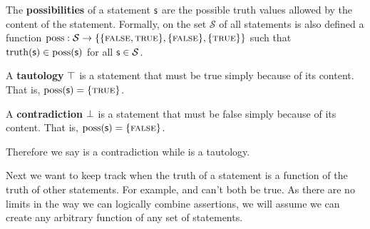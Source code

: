 \documentclass[11pt,letterpaper,fleqn]{memoir} %
\begin{document}
\begin{mathSection}
	
	\begin{axiom}\label{def_possibilities}
		The \textbf{possibilities} of a statement $\mathsf{s}$ are the possible truth values allowed by the content of the statement. Formally, on the set $\mathcal{S}$ of all statements is also defined a function $\operatorname{poss}: \mathcal{S} \to \{\{\textsc{false}, \textsc{true}\},\{\textsc{false}\},\{\textsc{true}\}\}$ such that $\operatorname{truth}(\mathsf{s}) \in \operatorname{poss}(\mathsf{s})$ for all $\mathsf{s} \in \mathcal{S}$.
	\end{axiom}
	
	\begin{defn}
		A \textbf{tautology} $\top$ is a statement that must be true simply because of its content. That is, $\operatorname{poss}(\mathsf{s}) = \{\textsc{true}\}$.
	\end{defn}
	
	\begin{defn}
		A \textbf{contradiction} $\bot$ is a statement that must be false simply because of its content. That is, $\operatorname{poss}(\mathsf{s}) = \{\textsc{false}\}$.
	\end{defn}
	
\end{mathSection}

Therefore we say  is a contradiction while  is a tautology.

Next we want to keep track when the truth of a statement is a function of the truth of other statements. For example,  and  can't both be true. As there are no limits in the way we can logically combine assertions, we will assume we can create any arbitrary function of any set of statements.
\end{document}
